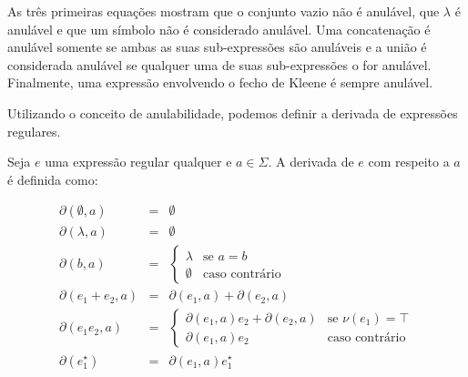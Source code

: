 As três primeiras equações mostram que o conjunto vazio não é
anulável, que \(\lambda\) é anulável e que um símbolo não é
considerado anulável. Uma concatenação é anulável somente se ambas as
suas sub-expressões são anuláveis e a união é considerada anulável se
qualquer uma de suas sub-expressões o for anulável. Finalmente, uma
expressão envolvendo o fecho de Kleene é sempre anulável.

Utilizando o conceito de anulabilidade, podemos definir a derivada de
expressões regulares.

\begin{Definition}
  Seja \(e\) uma expressão regular qualquer e \(a\in
  \Sigma\). A derivada de \(e\) com respeito a \(a\) é definida como:

  \[
    \begin{array}{lcl}
      \partial(\emptyset,a) & = & \emptyset\\
      \partial(\lambda, a)  & = & \emptyset\\
      \partial(b, a)         & = & \left\{
        \begin{array}{ll}
          \lambda & \textrm{se }a = b \\
          \emptyset & \textrm{caso contrário}
        \end{array}
        \right . \\
        \partial(e_1 + e_2, a) & = & \partial(e_1,a) + \partial(e_2,a)\\
        \partial(e_1 e_2, a)   & = & \left\{
          \begin{array}{ll}
            \partial(e_1, a) e_2 + \partial(e_2, a) & \textrm{se
            }\nu(e_1) = \top\\
            \partial(e_1,a) e_2 & \textrm{caso contrário}
          \end{array}
          \right .\\
          \partial(e_1^\star)   & = & \partial(e_1,a)e_1^\star
        \end{array}
      \]
    \end{Definition}

